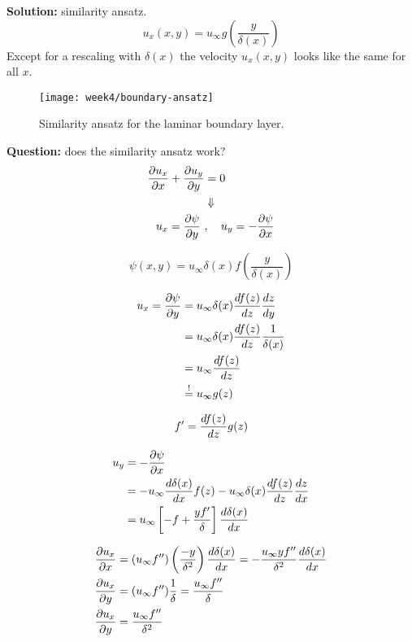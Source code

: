 \textbf{Solution:} similarity ansatz.
\begin{equation}
u_x(x,y) = u_\infty g\left(\frac{y}{\delta(x)}\right)
\end{equation}
Except for a rescaling with $\delta(x)$ the velocity $u_x(x,y)$ looks like the same for all $x$.
\begin{figure}[ht]
    \centering
    \texttt{[image: week4/boundary-ansatz]}\\
    \caption{Similarity ansatz for the laminar boundary layer.}
    \label{fig:boundary-ansatz}
\end{figure}


\textbf{Question:} does the similarity ansatz work?
\begin{align}
\frac{\partial u_x}{\partial x}+\frac{\partial u_y}{\partial y} &= 0 \\
&\Downarrow\notag\\
u_x = \frac{\partial \psi}{\partial y} \ &, \quad u_y = -\frac{\partial \psi}{\partial x}
\end{align}

\begin{equation}
\psi(x,y) = u_\infty\delta(x)f\left(\frac{y}{\delta(x)}\right)
\end{equation}

\begin{align}
u_x=\frac{\partial \psi}{\partial y} &= u_\infty\delta(x)\frac{d f(z)}{d z}\frac{d z}{d y} \\
&= u_\infty \delta(x) \frac{d f(z)}{d z}\frac{1}{\delta(x)}\\
&= u_\infty \frac{d f(z)}{d z} \\
&\overset{!}{=} u_\infty g(z)
\end{align}

\begin{equation}
f' = \frac{d f(z)}{d z}g(z)
\end{equation}

\begin{align}
u_y &= -\frac{\partial \psi}{\partial x} \\
&=  -u_\infty\frac{d \delta(x)}{d x}f(z) - u_\infty \delta(x)\frac{d f(z)}{d z}\frac{d z}{d x}\\
&= u_\infty \left[-f + \frac{y f'}{\delta}\right] \frac{d \delta(x)}{d x}
\end{align}

\begin{align}
\frac{\partial u_x}{\partial x} &= \left(u_\infty f''\right)\left(\frac{-y}{\delta^2}\right)\frac{d \delta(x)}{d x} = -\frac{u_\infty y f''}{\delta^2}\frac{d \delta(x)}{d x} \\
\frac{\partial u_x}{\partial y} &= (u_\infty f'') \frac{1}{\delta} = \frac{u_\infty f''}{\delta} \\
\frac{\partial u_x}{\partial y} &= \frac{u_\infty f''}{\delta^2}
\end{align}

